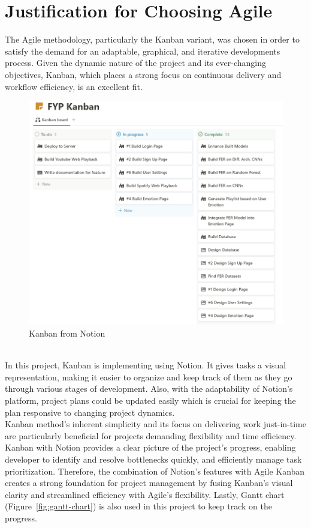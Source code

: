 \section{Justification for Choosing Agile}
The Agile methodology, particularly the Kanban variant, was chosen in order to satisfy the demand for an adaptable, graphical, and iterative developments process.
Given the dynamic nature of the project and its ever-changing objectives, Kanban, which places a strong focus on continuous delivery and workflow efficiency, is an excellent fit.
\\
\begin{figure}[!ht]
    \centering
    \includegraphics[width=12cm]{Images/kanban.png}
    \caption{Kanban from Notion}
    \label{fig:kanban}
\end{figure}
\\
\indent In this project, Kanban is implementing using Notion.
It gives tasks a visual representation, making it easier to organize and keep track of them as they go through various stages of development.
Also, with the adaptability of Notion's platform, project plans could be updated easily which is crucial for keeping the plan responsive to changing project dynamics.
\\
\indent Kanban method's inherent simplicity and its focus on delivering work just-in-time are particularly beneficial for projects demanding flexibility and time efficiency.
Kanban with Notion provides a clear picture of the project's progress, enabling developer to identify and resolve bottlenecks quickly, and efficiently manage task prioritization.
Therefore, the combination of Notion's features with Agile Kanban creates a strong foundation for project management by fusing Kanban's visual clarity and streamlined efficiency with Agile's flexibility. 
Lastly, Gantt chart (Figure~\ref{fig:gantt-chart}) is also used in this project to keep track on the progress.

